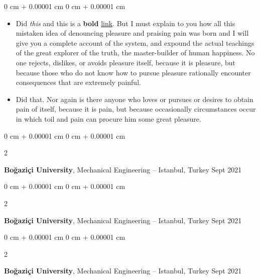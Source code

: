 \documentclass[10pt, letterpaper]{article}
\newenvironment{highlights}{
    \begin{itemize}[
        topsep=0.10 cm,
        parsep=0.10 cm,
        partopsep=0pt,
        itemsep=0pt,
        leftmargin=0 cm + 10pt
    ]
}{
    \end{itemize}
} %
\newenvironment{onecolentry}{
    \begin{adjustwidth}{
        0 cm + 0.00001 cm
    }{
        0 cm + 0.00001 cm
    }
}{
    \end{adjustwidth}
} %
\newenvironment{twocolentry}[2][]{
    \onecolentry
    \def\secondColumn{#2}
    \setcolumnwidth{\fill, 4.5 cm}
    \begin{paracol}{2}
}{
    \switchcolumn \raggedleft \secondColumn
    \end{paracol}
    \endonecolentry
} %
\begin{document}
        \vspace{0.10 cm}
        \begin{onecolentry}
            \begin{highlights}
                \item Did \textit{this} and this is a \textbf{bold} \href{https://example.com}{link}. But I must explain to you how all this mistaken idea of denouncing pleasure and praising pain was born and I will give you a complete account of the system, and expound the actual teachings of the great explorer of the truth, the master-builder of human happiness. No one rejects, dislikes, or avoids pleasure itself, because it is pleasure, but because those who do not know how to pursue pleasure rationally encounter consequences that are extremely painful.
                \item Did that. Nor again is there anyone who loves or pursues or desires to obtain pain of itself, because it is pain, but because occasionally circumstances occur in which toil and pain can procure him some great pleasure.
            \end{highlights}
        \end{onecolentry}


        \vspace{0.2 cm}

        \begin{twocolentry}{
            Sept 2021
        }
            \textbf{Boğaziçi University}, Mechanical Engineering -- Istanbul, Turkey\end{twocolentry}



        \vspace{0.2 cm}

        \begin{twocolentry}{
            Sept 2021
        }
            \textbf{Boğaziçi University}, Mechanical Engineering -- Istanbul, Turkey\end{twocolentry}



        \vspace{0.2 cm}

        \begin{twocolentry}{
            Sept 2021
        }
            \textbf{Boğaziçi University}, Mechanical Engineering -- Istanbul, Turkey\end{twocolentry}
\end{document}
